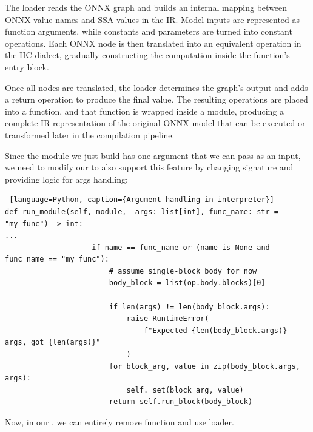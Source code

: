 \documentclass[../main.tex]{subfiles}
\begin{document}
The loader reads the ONNX graph and builds an internal mapping between ONNX value
names and SSA values in the IR. Model inputs are represented as function arguments,
while constants and parameters are turned into constant operations. Each ONNX node
is then translated into an equivalent operation in the HC dialect, gradually constructing
the computation inside the function’s entry block.

Once all nodes are translated, the loader determines the graph’s output and adds a
return operation to produce the final value. The resulting operations are placed into
a function, and that function is wrapped inside a module, producing a complete IR
representation of the original ONNX model that can be executed or transformed later
in the compilation pipeline.

Since the module we just build has one argument that we can pass as an input, we need to
modify our  to also support this feature by changing 
signature and providing logic for args handling:
\begin{lstlisting} [language=Python, caption={Argument handling in interpreter}]
def run_module(self, module,  args: list[int], func_name: str = "my_func") -> int:
...
                    if name == func_name or (name is None and func_name == "my_func"):
                        # assume single-block body for now
                        body_block = list(op.body.blocks)[0]

                        if len(args) != len(body_block.args):
                            raise RuntimeError(
                                f"Expected {len(body_block.args)} args, got {len(args)}"
                            )
                        for block_arg, value in zip(body_block.args, args):
                            self._set(block_arg, value)
                        return self.run_block(body_block)
\end{lstlisting}

Now, in our , we can entirely remove  function and use
loader.
\end{document}
